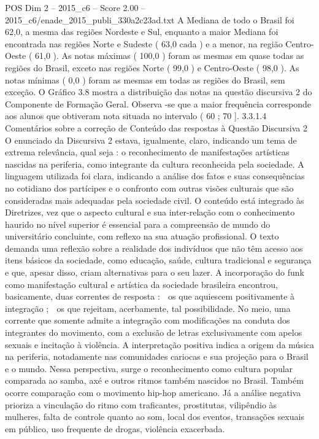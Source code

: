 \begin{textsample}{POS Dim 2 – 2015\_c6 – Score 2.00 – 2015\_c6/enade\_2015\_publi\_330a2c23ad.txt}
A Mediana de todo o Brasil foi 62,0, a mesma das regiões Nordeste e Sul, enquanto a maior Mediana foi encontrada nas regiões Norte e Sudeste ( 63,0 cada ) e a menor, na região Centro-Oeste ( 61,0 ).
As notas máximas ( 100,0 ) foram as mesmas em quase todas as regiões do Brasil, exceto nas regiões Norte ( 99,0 ) e Centro-Oeste ( 98,0 ).
As notas mínimas ( 0,0 ) foram as mesmas em todas as regiões do Brasil, sem exceção.
O Gráfico 3.8 mostra a distribuição das notas na questão discursiva 2 do Componente de Formação Geral.
Observa -se que a maior frequência corresponde aos alunos que obtiveram nota situada no intervalo ( 60 ; 70 ]. 3.3.1.4 Comentários sobre a correção de Conteúdo das respostas à Questão Discursiva 2 O enunciado da Discursiva 2 estava, igualmente, claro, indicando um tema de extrema relevância, qual seja : o reconhecimento de manifestações artísticas nascidas na periferia, como integrante da cultura reconhecida pela sociedade.
A linguagem utilizada foi clara, indicando a análise dos fatos e suas consequências no cotidiano dos partícipes e o confronto com outras visões culturais que são consideradas mais adequadas pela sociedade civil.
O conteúdo está integrado às Diretrizes, vez que o aspecto cultural e sua inter-relação com o conhecimento haurido no nível superior é essencial para a compreensão de mundo do universitário concluinte, com reflexo na sua atuação profissional.
O texto demanda uma reflexão sobre a realidade dos indivíduos que não têm acesso aos itens básicos da sociedade, como educação, saúde, cultura tradicional e segurança e que, apesar disso, criam alternativas para o seu lazer.
A incorporação do funk como manifestação cultural e artística da sociedade brasileira encontrou, basicamente, duas correntes de resposta :  os que aquiescem positivamente à integração ;  os que rejeitam, acerbamente, tal possibilidade.
No meio, uma corrente que somente admite a integração com modificações na conduta dos integrantes do movimento, com a exclusão de letras exclusivamente com apelos sexuais e incitação à violência.
A interpretação positiva indica a origem da música na periferia, notadamente nas comunidades cariocas e sua projeção para o Brasil e o mundo.
Nessa perspectiva, surge o reconhecimento como cultura popular comparada ao samba, axé e outros ritmos também nascidos no Brasil.
Também ocorre comparação com o movimento hip-hop americano.
Já a análise negativa prioriza a vinculação do ritmo com traficantes, prostitutas, vilipêndio às mulheres, falta de controle quanto ao som, local dos eventos, transações sexuais em público, uso frequente de drogas, violência exacerbada.

\end{textsample}
